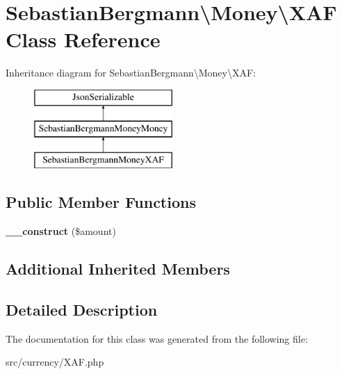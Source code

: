 \hypertarget{classSebastianBergmann_1_1Money_1_1XAF}{}\section{Sebastian\+Bergmann\textbackslash{}Money\textbackslash{}X\+A\+F Class Reference}
\label{classSebastianBergmann_1_1Money_1_1XAF}
Inheritance diagram for Sebastian\+Bergmann\textbackslash{}Money\textbackslash{}X\+A\+F\+:\begin{figure}[H]
\begin{center}
\leavevmode
\includegraphics[height=3.000000cm]{classSebastianBergmann_1_1Money_1_1XAF}
\end{center}
\end{figure}
\subsection*{Public Member Functions}
\begin{DoxyCompactItemize}
\item 
\hypertarget{classSebastianBergmann_1_1Money_1_1XAF_a8be886dd3e6d3d0bce7e937b3117a417}{}{\bfseries \+\_\+\+\_\+construct} (\$amount)\label{classSebastianBergmann_1_1Money_1_1XAF_a8be886dd3e6d3d0bce7e937b3117a417}

\end{DoxyCompactItemize}
\subsection*{Additional Inherited Members}


\subsection{Detailed Description}


The documentation for this class was generated from the following file\+:\begin{DoxyCompactItemize}
\item 
src/currency/X\+A\+F.\+php\end{DoxyCompactItemize}
